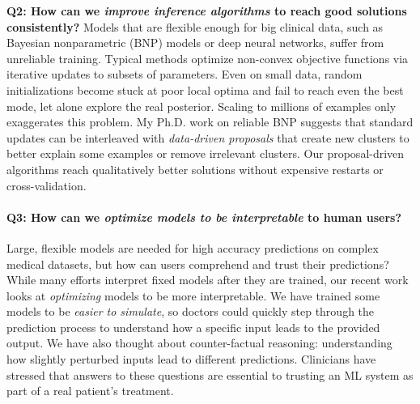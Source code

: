\documentclass[11pt,letterpaper]{article}
\begin{document}


\textbf{Q2: How can we \emph{improve inference algorithms} to reach good solutions consistently?} 
Models that are flexible enough for big clinical data, such as Bayesian nonparametric (BNP) models or deep neural networks,
suffer from unreliable training.
Typical methods optimize non-convex objective functions via iterative updates to subsets of parameters. Even on small data, random initializations become stuck at poor local optima and fail to reach even the best mode, let alone explore the real posterior. Scaling to millions of examples only exaggerates this problem.
My Ph.D. work on reliable BNP suggests that standard updates can be interleaved with \emph{data-driven proposals} that create new clusters to better explain some examples or remove irrelevant clusters.
Our proposal-driven algorithms reach qualitatively better solutions without expensive restarts or cross-validation.

\paragraph{{Q3: How can we \emph{optimize models to be interpretable} to human users?}}
Large, flexible models are needed for high accuracy predictions on complex medical datasets, but how can users comprehend and trust their predictions?
While many efforts interpret fixed models after they are trained, our recent work looks at \emph{optimizing} models to be more interpretable. 
We have trained some models to be \emph{easier to simulate}, so doctors could quickly step through the prediction process to understand how a specific input leads to the provided output.
We have also thought about counter-factual reasoning: understanding how slightly perturbed inputs lead to different predictions. Clinicians have stressed that answers to these questions are essential to trusting an ML system as part of a real patient's treatment.
\end{document}
